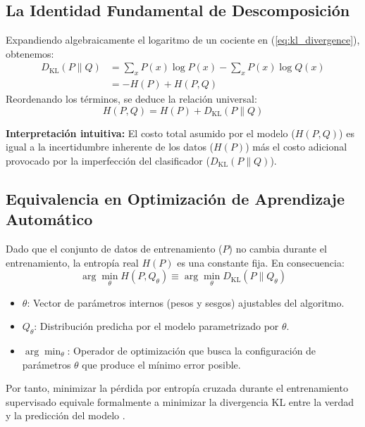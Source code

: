 \documentclass[conference]{IEEEtran}
\begin{document}
	\subsection{La Identidad Fundamental de Descomposición}
	Expandiendo algebraicamente el logaritmo de un cociente en (\ref{eq:kl_divergence}), obtenemos:
	\begin{align}
		D_{\text{KL}}(P \parallel Q) &= \sum_{x} P(x)\log P(x) - \sum_{x} P(x)\log Q(x) \nonumber \\
		&= -H(P) + H(P, Q)
	\end{align}
	Reordenando los términos, se deduce la relación universal:
	\begin{equation}
		H(P, Q) = H(P) + D_{\text{KL}}(P \parallel Q)
		\label{eq:decomposition}
	\end{equation}
	
	\noindent \textbf{Interpretación intuitiva:} El costo total asumido por el modelo ($H(P, Q)$) es igual a la incertidumbre inherente de los datos ($H(P)$) más el costo adicional provocado por la imperfección del clasificador ($D_{\text{KL}}(P \parallel Q)$).
	
	\subsection{Equivalencia en Optimización de Aprendizaje Automático}
	Dado que el conjunto de datos de entrenamiento ($P$) no cambia durante el entrenamiento, la entropía real $H(P)$ es una constante fija. En consecuencia:
	\begin{equation}
		\arg\min_{\theta} H(P, Q_\theta) \equiv \arg\min_{\theta} D_{\text{KL}}(P \parallel Q_\theta)
		\label{eq:optimization}
	\end{equation}
	\begin{itemize}
		\item $\theta$: Vector de parámetros internos (pesos y sesgos) ajustables del algoritmo.
		\item $Q_\theta$: Distribución predicha por el modelo parametrizado por $\theta$.
		\item $\arg\min_\theta$: Operador de optimización que busca la configuración de parámetros $\theta$ que produce el mínimo error posible.
	\end{itemize}
	
	Por tanto, minimizar la pérdida por entropía cruzada durante el entrenamiento supervisado equivale formalmente a minimizar la divergencia KL entre la verdad y la predicción del modelo \cite{bishop2006pattern}.
	
\end{document}
